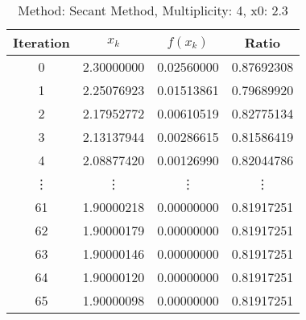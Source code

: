 \begin{table}
\centering
\caption{Method: Secant Method, Multiplicity: 4, x0: 2.3}
\label{tab:table_Secant_Method_4_2_3}
\begin{tabular}{c c c c}
\toprule
Iteration &      $x_k$ &   $f(x_k)$ &      Ratio \\
\midrule
        0 & 2.30000000 & 0.02560000 & 0.87692308 \\
        1 & 2.25076923 & 0.01513861 & 0.79689920 \\
        2 & 2.17952772 & 0.00610519 & 0.82775134 \\
        3 & 2.13137944 & 0.00286615 & 0.81586419 \\
        4 & 2.08877420 & 0.00126990 & 0.82044786 \\
   \vdots &     \vdots &     \vdots &     \vdots \\
       61 & 1.90000218 & 0.00000000 & 0.81917251 \\
       62 & 1.90000179 & 0.00000000 & 0.81917251 \\
       63 & 1.90000146 & 0.00000000 & 0.81917251 \\
       64 & 1.90000120 & 0.00000000 & 0.81917251 \\
       65 & 1.90000098 & 0.00000000 & 0.81917251 \\
\bottomrule
\end{tabular}
\end{table}
